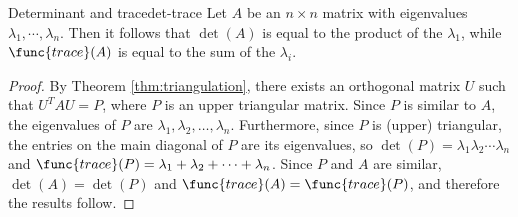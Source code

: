 \begin{corollary}{Determinant and trace}{det-trace}
Let $A$ be an $n \times n$ matrix with eigenvalues $\lambda_1, \cdots, \lambda_n$. Then it follows that $\det(A)$ is equal to the product of the $\lambda_1$, while $\func{trace}(A)$ is equal to the sum of the $\lambda_i$. 
\end{corollary}

\begin{proof}
By Theorem \ref{thm:triangulation}, there exists an orthogonal matrix $U$ such
that $U^TAU=P$, where $P$ is an upper triangular matrix.
Since $P$ is similar to $A$, the eigenvalues
of $P$ are $\lambda_1, \lambda_2, \ldots, \lambda_n$.
Furthermore, since $P$ is (upper) triangular, the entries on the
main diagonal of $P$ are its eigenvalues, so
$\det(P)=\lambda_1 \lambda_2 \cdots \lambda_n$ and
$\func{trace}(P)=\lambda_1 + \lambda_2 + \cdots + \lambda_n$.
Since $P$ and $A$ are similar, $\det(A)=\det(P)$ and $\func{trace}(A)=\func{trace}(P)$,
and therefore the results follow.
\end{proof}
